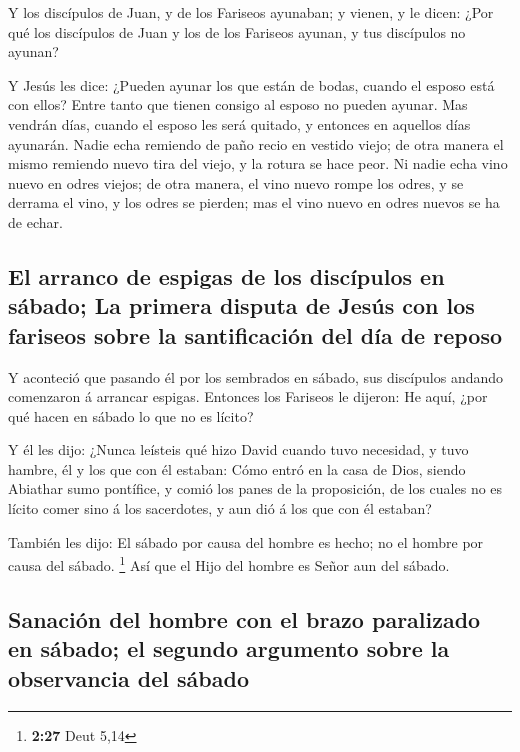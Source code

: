  Y los discípulos de Juan, y de los Fariseos ayunaban; y
vienen, y le dicen: ¿Por qué los discípulos de Juan y los de los
Fariseos ayunan, y tus discípulos no ayunan?

 Y Jesús les dice: ¿Pueden ayunar los que están de bodas,
cuando el esposo está con ellos? Entre tanto que tienen consigo al
esposo no pueden ayunar.  Mas vendrán días, cuando el
esposo les será quitado, y entonces en aquellos días ayunarán.
 Nadie echa remiendo de paño recio en vestido viejo; de
otra manera el mismo remiendo nuevo tira del viejo, y la rotura se hace
peor.  Ni nadie echa vino nuevo en odres viejos; de otra
manera, el vino nuevo rompe los odres, y se derrama el vino, y los odres
se pierden; mas el vino nuevo en odres nuevos se ha de echar.

\hypertarget{el-arranco-de-espigas-de-los-discuxedpulos-en-suxe1bado-la-primera-disputa-de-jesuxfas-con-los-fariseos-sobre-la-santificaciuxf3n-del-duxeda-de-reposo}{%
\subsection{El arranco de espigas de los discípulos en sábado; La
primera disputa de Jesús con los fariseos sobre la santificación del día
de
reposo}\label{el-arranco-de-espigas-de-los-discuxedpulos-en-suxe1bado-la-primera-disputa-de-jesuxfas-con-los-fariseos-sobre-la-santificaciuxf3n-del-duxeda-de-reposo}}

 Y aconteció que pasando él por los sembrados en sábado,
sus discípulos andando comenzaron á arrancar espigas. 
Entonces los Fariseos le dijeron: He aquí, ¿por qué hacen en sábado lo
que no es lícito?

 Y él les dijo: ¿Nunca leísteis qué hizo David cuando
tuvo necesidad, y tuvo hambre, él y los que con él estaban:
 Cómo entró en la casa de Dios, siendo Abiathar sumo
pontífice, y comió los panes de la proposición, de los cuales no es
lícito comer sino á los sacerdotes, y aun dió á los que con él estaban?

 También les dijo: El sábado por causa del hombre es
hecho; no el hombre por causa del sábado. \footnote{\textbf{2:27} Deut
  5,14}  Así que el Hijo del hombre es Señor aun del
sábado.

\hypertarget{sanaciuxf3n-del-hombre-con-el-brazo-paralizado-en-suxe1bado-el-segundo-argumento-sobre-la-observancia-del-suxe1bado}{%
\subsection{Sanación del hombre con el brazo paralizado en sábado; el
segundo argumento sobre la observancia del
sábado}\label{sanaciuxf3n-del-hombre-con-el-brazo-paralizado-en-suxe1bado-el-segundo-argumento-sobre-la-observancia-del-suxe1bado}}

